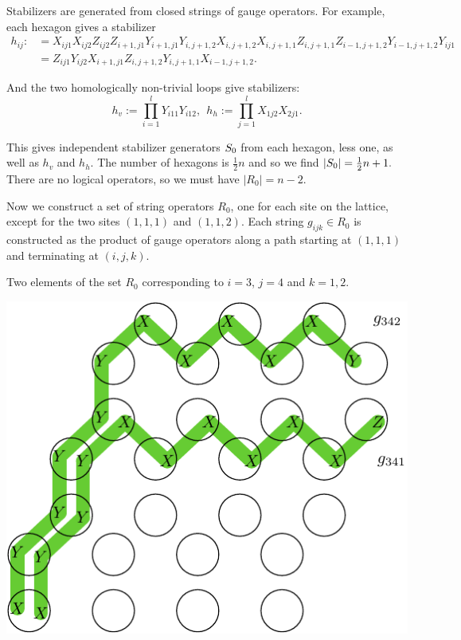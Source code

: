 \documentclass[12pt]{article}
\begin{document}
Stabilizers are generated from closed strings of
gauge operators. 
For example, each hexagon gives a stabilizer
\begin{align*}
h_{ij}:&= 
X_{ij1}X_{ij2}
Z_{ij2}Z_{i+1,j1}
Y_{i+1,j1}Y_{i,j+1,2}
X_{i,j+1,2}X_{i,j+1,1}
Z_{i,j+1,1}Z_{i-1,j+1,2}
Y_{i-1,j+1,2}Y_{ij1}
\\
&= 
Z_{ij1} Y_{ij2} X_{i+1,j1}
Z_{i,j+1,2} Y_{i,j+1,1} X_{i-1,j+1,2}.
\end{align*}

And the two homologically non-trivial loops
give stabilizers:
$$
h_v := \prod_{i=1}^l Y_{i11} Y_{i12},\ \ 
h_h := \prod_{j=1}^l X_{1j2} X_{2j1}.
$$

This gives independent stabilizer generators $S_0$
from each hexagon, less one, as well as $h_v$ and $h_h.$
The number of hexagons is $\frac{1}{2}n$ and
so we find $|S_0|=\frac{1}{2} n+1.$
There are no logical operators, so we
must have $|R_0|=n-2.$


Now we construct a set of string operators $R_0$,
one for each site on the lattice, except for
the two sites $(1,1,1)$ and $(1,1,2).$
Each string $g_{ijk}\in R_0$
is constructed as the product of
gauge operators along a path starting at
$(1,1,1)$ and terminating at $(i,j,k).$

Two elements of the set $R_0$ corresponding
to $i=3$, $j=4$ and $k=1,2.$
\begin{center}
\includegraphics[width=0.5\columnwidth]{fig_01.pdf}
\end{center}
\end{document}
